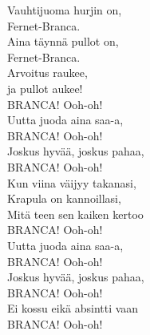 
Vauhtijuoma hurjin on, \\
Fernet-Branca. \\
Aina täynnä pullot on, \\
Fernet-Branca. \\
Arvoitus raukee, \\
ja pullot aukee! \\
BRANCA! Ooh-oh! \\
Uutta juoda aina saa-a, \\
BRANCA! Ooh-oh! \\
Joskus hyvää, joskus pahaa, \\
BRANCA! Ooh-oh! \\
Kun viina väijyy takanasi, \\
Krapula on kannoillasi, \\
Mitä teen sen kaiken kertoo \\
BRANCA! Ooh-oh! \\
Uutta juoda aina saa-a, \\
BRANCA! Ooh-oh! \\
Joskus hyvää, joskus pahaa, \\
BRANCA! Ooh-oh! \\
Ei kossu eikä absintti vaan \\
BRANCA! Ooh-oh! \\
